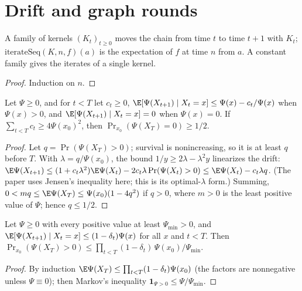 \section{Drift and graph rounds}
\begin{definition}\label{def:iterateseq}
\leanok{}
A family of kernels $(K_t)_{t\ge0}$ moves the chain from time $t$ to time
$t+1$ with $K_t$; $\mathrm{iterateSeq}(K,n,f)(a)$ is the expectation of $f$ at
time $n$ from $a$. A constant family gives the iterates of a single kernel.
\end{definition}
\begin{proof}\leanok
Induction on $n$.
\end{proof}
\begin{theorem}\label{thm:drift}
\leanok
{}
Let $\Psi\ge0$, and for $t<T$ let $c_t\ge0$,
$\E[\Psi(X_{t+1})\mid X_t=x]\le\Psi(x)-c_t/\Psi(x)$ when $\Psi(x)>0$, and
$\E[\Psi(X_{t+1})\mid X_t=x]=0$ when $\Psi(x)=0$. If
$\sum_{t<T}c_t\ge4\Psi(x_0)^2$, then $\Pr_{x_0}(\Psi(X_T)=0)\ge1/2$.
\end{theorem}
\begin{proof}\leanok
Let $q=\Pr(\Psi(X_T)>0)$; survival is nonincreasing, so it is at least $q$
before $T$. With $\lambda=q/\Psi(x_0)$, the bound $1/y\ge2\lambda-\lambda^2y$
linearizes the drift: $\E\Psi(X_{t+1})\le(1+c_t\lambda^2)\E\Psi(X_t)
-2c_t\lambda\Pr(\Psi(X_t)>0)\le\E\Psi(X_t)-c_t\lambda q$. (The paper uses
Jensen's inequality here; this is its optimal-$\lambda$ form.) Summing,
$0<m q\le\E\Psi(X_T)\le\Psi(x_0)(1-4q^2)$ if $q>0$, where $m>0$ is the least
positive value of $\Psi$; hence $q\le1/2$.
\end{proof}
\begin{theorem}\label{thm:multdrift}
\leanok
{}
Let $\Psi\ge0$ with every positive value at least $\Psi_{\min}>0$, and
$\E[\Psi(X_{t+1})\mid X_t=x]\le(1-\delta_t)\Psi(x)$ for all $x$ and $t<T$.
Then $\Pr_{x_0}(\Psi(X_T)>0)\le\prod_{t<T}(1-\delta_t)\,\Psi(x_0)/\Psi_{\min}$.
\end{theorem}
\begin{proof}\leanok
By induction $\E\Psi(X_T)\le\prod_{t<T}(1-\delta_t)\Psi(x_0)$ (the factors are
nonnegative unless $\Psi\equiv0$); then Markov's inequality
$\mathbf 1_{\Psi>0}\le\Psi/\Psi_{\min}$.
\end{proof}
